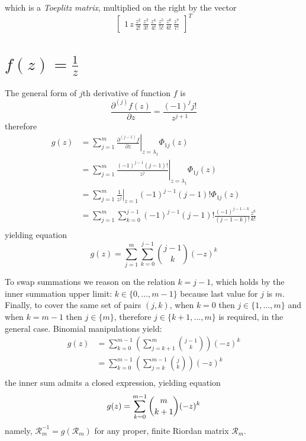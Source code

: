 which is a \emph{Toeplitz matrix}, multiplied on the right by the vector 
$$\left[\begin{matrix}1\,z\,\frac{z^{2}}{2!}\,\frac{z^{3}}{3!}\,\frac{z^{4}}{4!}\,\frac{z^{5}}{5!}\,\frac{z^{6}}{6!}\,\frac{z^{7}}{7!}\end{matrix}\right]^{T}$$


\section{$f(z)=\frac{1}{z}$}

The general form of $j$th derivative of function $f$ is 
$$\frac{\partial^{(j)}{f}(z)}{\partial{z}} = \frac{(-1)^{j}j!}{z^{j+1}}$$ 
therefore
\begin{displaymath}
\begin{split}
  g(z) &= \sum_{j=1}^{m}{ \left. \frac{\partial^{(j-1)}{f}}{\partial{z}} \right|_{z=\lambda_{1}}\Phi_{1j}(z)} \\
       &= \sum_{j=1}^{m}{ \left. \frac{(-1)^{j-1}(j-1)!}{z^{j}} \right|_{z=\lambda_{1}}\Phi_{1j}(z)} \\
       &= \sum_{j=1}^{m}{ \left. \frac{1}{z^{j}} \right|_{z=1}(-1)^{j-1}(j-1)!\Phi_{1j}(z)} \\
       &= \sum_{j=1}^{m}{\sum_{k=0}^{j-1}{(-1)^{j-1}(j-1)!\frac{(-1)^{j-1-k}}{(j-1-k)!}\frac{z^{k}}{k!}}} \\
\end{split}
\end{displaymath}
yielding equation
\begin{equation}
  g(z) = \sum_{j=1}^{m}{\sum_{k=0}^{j-1}{{{j-1}\choose{k}}(-z)^{k}}} 
\end{equation}

To swap summations we reason on the relation $k=j-1$, which holds by the inner summation upper limit:
$k\in \lbrace 0,\ldots,m-1 \rbrace$ because last value for $j$ is $m$. Finally, to cover the same set 
of pairs $(j, k)$, when $k=0$ then $j\in \lbrace 1,\ldots,m \rbrace$ and when $k=m-1$ then 
$j\in \lbrace m \rbrace$, therefore $j\in \lbrace k+1, \ldots, m \rbrace$ is required, in the general case.
Binomial manipulations yield:
\begin{displaymath}
\begin{split}
  g(z) &= \sum_{k=0}^{m-1}{\left(\sum_{j=k+1}^{m}{{{j-1}\choose{k}}}\right)(-z)^{k}} \\
       &= \sum_{k=0}^{m-1}{\left(\sum_{j=k}^{m-1}{{{j}\choose{k}}}\right)(-z)^{k}} \\
\end{split}
\end{displaymath}
the inner sum admits a closed expression, yielding equation
\begin{equation}
  g(z) = \sum_{k=0}^{m-1}{{{m}\choose{k+1}}(-z)^{k}} \\
\end{equation}
namely, $\mathcal{R}_{m}^{-1}=g(\mathcal{R}_{m})$ for any proper, finite Riordan matrix $\mathcal{R}_{m}$.

